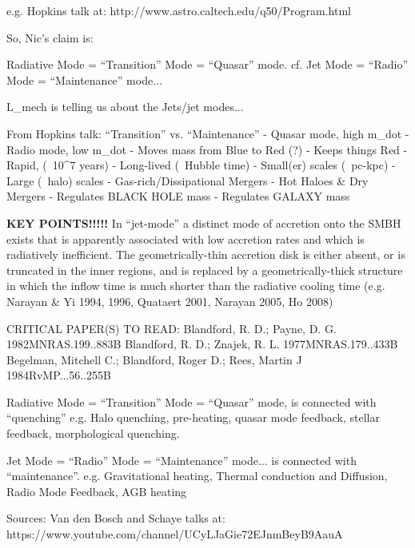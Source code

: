 
e.g.
Hopkins talk at:
http://www.astro.caltech.edu/q50/Program.html

So, Nic's claim is:

Radiative Mode = ``Transition'' Mode = ``Quasar'' mode. 
   cf. 
Jet Mode = ``Radio'' Mode = ``Maintenance'' mode...


L_mech is telling us about the Jets/jet modes...


From Hopkins talk:
   ``Transition''                    vs.           ``Maintenance'' 
- Quasar mode, high m_dot                        - Radio mode, low m_dot
- Moves mass from Blue to Red (?)                - Keeps things Red
- Rapid, (~10^7 years)                           - Long-lived (~Hubble time)
- Small(er) scales (~pc-kpc)                     - Large (~halo) scales
- Gas-rich/Dissipational Mergers                 - Hot Haloes & Dry Mergers
- Regulates BLACK HOLE mass                      - Regulates GALAXY mass


{\bf KEY POINTS!!!!!}
In ``jet-mode'' a distinct mode of accretion onto the SMBH exists that is apparently associated with low accretion rates and which is radiatively inefficient. The geometrically-thin accretion disk is either absent, or is truncated in the inner regions, and is replaced by a geometrically-thick structure in which the inflow time is much shorter than the radiative cooling time (e.g. Narayan \& Yi 1994, 1996, Quataert 2001, Narayan 2005, Ho 2008)

CRITICAL PAPER(S) TO READ:  
Blandford, R. D.; Payne, D. G.
 1982MNRAS.199..883B
Blandford, R. D.; Znajek, R. L.
 1977MNRAS.179..433B
Begelman, Mitchell C.; Blandford, Roger D.; Rees, Martin J
 1984RvMP...56..255B


Radiative Mode = ``Transition'' Mode = ``Quasar'' mode, 
is connected with ``quenching'' 
e.g. Halo quenching, pre-heating, quasar mode feedback, stellar feedback, morphological quenching. 

Jet Mode = ``Radio'' Mode = ``Maintenance'' mode...
is connected with ``maintenance''. 
e.g. Gravitational heating, Thermal conduction and Diffusion, Radio Mode Feedback, AGB heating

Sources: 
Van den Bosch and Schaye talks at:
https://www.youtube.com/channel/UCyLJaGie72EJnmBeyB9AauA



